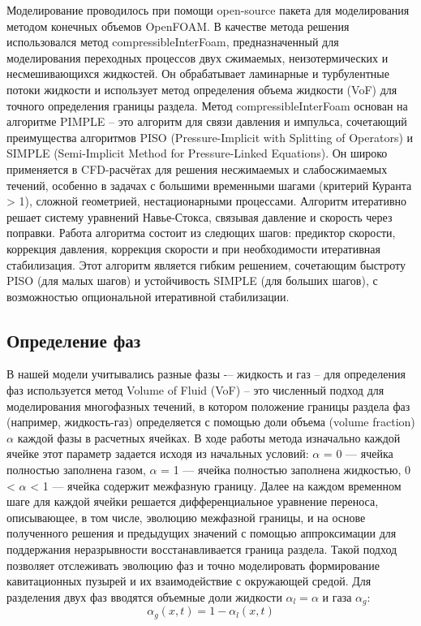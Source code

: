 Моделирование проводилось при помощи open-source пакета для моделирования методом конечных объемов OpenFOAM.
В качестве метода решения использовался метод compressibleInterFoam, предназначенный для моделирования переходных процессов двух сжимаемых, неизотермических и несмешивающихся жидкостей.
Он обрабатывает ламинарные и турбулентные потоки жидкости и использует метод определения объема жидкости (VoF) для точного определения границы раздела.
Метод compressibleInterFoam основан на алгоритме PIMPLE -- это алгоритм для связи давления и импульса, сочетающий преимущества алгоритмов PISO (Pressure-Implicit with Splitting of Operators) и SIMPLE (Semi-Implicit Method for Pressure-Linked Equations). 
Он широко применяется в CFD-расчётах для решения несжимаемых и слабосжимаемых течений, особенно в задачах с большими временными шагами (критерий Куранта > 1), сложной геометрией, нестационарными процессами.
Алгоритм итеративно решает систему уравнений Навье-Стокса, связывая давление и скорость через поправки.
Работа алгоритма состоит из следющих шагов: предиктор скорости, коррекция давления, коррекция скорости и при необходимости итеративная стабилизация.
Этот алгоритм является гибким решением, сочетающим быстроту PISO (для малых шагов) и устойчивость SIMPLE (для больших шагов), с возможностью опциональной итеративной стабилизации.

\vspace{0.5\baselineskip}
\subsection{Определение фаз}
\vspace{0.5\baselineskip}

В нашей модели учитывались разные фазы -– жидкость и газ -- для определения фаз используется метод Volume of Fluid (VoF) -- это численный подход для моделирования многофазных течений, в котором положение границы раздела фаз (например, жидкость-газ) определяется с помощью доли объема (volume fraction) $\alpha$ каждой фазы в расчетных ячейках.
В ходе работы метода изначально каждой ячейке этот параметр задается исходя из начальных условий: $\alpha$ = 0 — ячейка полностью заполнена газом, $\alpha$ = 1 — ячейка полностью заполнена жидкостью, 0 < $\alpha$ < 1 — ячейка содержит межфазную границу.
Далее на каждом временном шаге для каждой ячейки решается дифференциальное уравнение переноса, описывающее, в том числе, эволюцию межфазной границы, и на основе полученного решения и предыдущих значений с помощью аппроксимации для поддержания неразрывности восстанавливается граница раздела.
Такой подход позволяет отслеживать эволюцию фаз и точно моделировать формирование кавитационных пузырей и их взаимодействие с окружающей средой.
Для разделения двух фаз вводятся объемные доли жидкости $\alpha _ {l} = \alpha$ и газа $\alpha _ {g}$:
\begin{equation}
    \alpha _ {g}  (x,t) = 1 - \alpha _ {l}  (x,t)
\end{equation}


